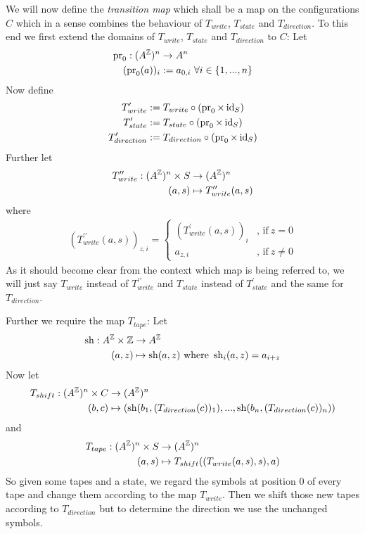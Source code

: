 We will now define the \emph{transition map} which shall be a map on the configurations $C$ which in a sense combines the behaviour of $T_{write}$, $T_{state}$ and $T_{direction}$.
To this end we first extend the domains of $T_{write}$, $T_{state}$ and $T_{direction}$ to $C$:
Let
\begin{align*}
	\operatorname{pr}_0: (A^{\mathbb{Z}})^n &\to A^n \\
	(\operatorname{pr}_0(a))_i &:= a_{0,i}~\forall i \in \{1,...,n\}
\end{align*}
Now define
\begin{align*}
	T_{write}^\prime &:= T_{write} \circ (\operatorname{pr}_0 \times \operatorname{id}_S) \\
	T_{state}^\prime &:= T_{state} \circ (\operatorname{pr}_0 \times \operatorname{id}_S) \\
	T_{direction}^\prime &:= T_{direction} \circ (\operatorname{pr}_0 \times \operatorname{id}_S)
\end{align*}
Further let
\begin{align*}
	T_{write}^{\prime\prime}: (A^{\mathbb{Z}})^n \times S &\to (A^{\mathbb{Z}})^n \\
	(a,s) &\mapsto T_{write}^{\prime\prime}(a,s) \\
\end{align*}
where
\begin{align*}
	(T_{write}^{\prime\prime}(a,s))_{z,i} =
	\begin{cases}
		(T_{write}^\prime(a,s))_i &\text{, if}~z = 0 \\
		a_{z,i} &\text{, if}~z \neq 0
	\end{cases}
\end{align*}
As it should become clear from the context which map is being referred to, we will just say $T_{write}$ instead of $T_{write}^{\prime\prime}$
and $T_{state}$ instead of $T_{state}^{\prime}$
and the same for $T_{direction}$.

Further we require the map $T_{tape}$:
Let
\begin{align*}
	\operatorname{sh}: A^{\mathbb{Z}} \times \mathbb{Z} &\to A^{\mathbb{Z}} \\
	(a,z) &\mapsto \operatorname{sh}(a,z) ~\text{where}~ \operatorname{sh}_i(a,z) = a_{i+z}
\end{align*}
Now let
\begin{align*}
	T_{shift}: (A^{\mathbb{Z}})^n \times C &\to (A^{\mathbb{Z}})^n \\
	(b,c) &\mapsto ( \operatorname{sh}(b_1,(T_{direction}(c))_1) , ... , \operatorname{sh}(b_n,(T_{direction}(c))_n) )
\end{align*}
and
\begin{align*}
	T_{tape}: (A^{\mathbb{Z}})^n \times S &\to (A^{\mathbb{Z}})^n \\
	(a,s) &\mapsto T_{shift} ((T_{write} (a,s) , s) , a)
\end{align*}
So given some tapes and a state, we regard the symbols at position 0 of every tape and change them according to the map $T_{write}$.
Then we shift those new tapes according to $T_{direction}$ but to determine the direction we use the unchanged symbols.

